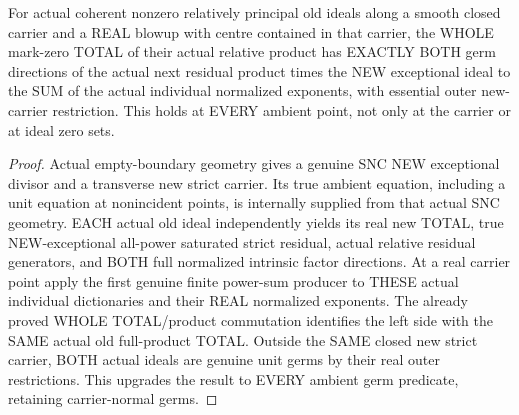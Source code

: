 \begin{theorem}
\label{hir:sharp-actual-next-whole-product-new-exceptional-factor-sum}
\leanok
For actual coherent nonzero relatively principal old ideals along a smooth
closed carrier and a REAL blowup with centre contained in that carrier,
the WHOLE mark-zero TOTAL of their actual relative product has EXACTLY
BOTH germ directions of the actual next residual product times the NEW
exceptional ideal to the SUM of the actual individual normalized exponents,
with essential outer new-carrier restriction. This holds at EVERY ambient
point, not only at the carrier or at ideal zero sets.
\end{theorem}
\begin{proof}
Actual empty-boundary geometry gives a genuine SNC NEW exceptional divisor
and a transverse new strict carrier. Its true ambient equation, including
a unit equation at nonincident points, is internally supplied from that
actual SNC geometry. EACH actual old ideal independently yields its real
new TOTAL, true NEW-exceptional all-power saturated strict residual,
actual relative residual generators, and BOTH full normalized intrinsic
factor directions. At a real carrier point apply the first genuine finite
power-sum producer to THESE actual individual dictionaries and their REAL
normalized exponents. The already proved WHOLE TOTAL/product commutation
identifies the left side with the SAME actual old full-product TOTAL.
Outside the SAME closed new strict carrier, BOTH actual ideals are genuine
unit germs by their real outer restrictions. This upgrades the result to
EVERY ambient germ predicate, retaining carrier-normal germs.
\end{proof}

